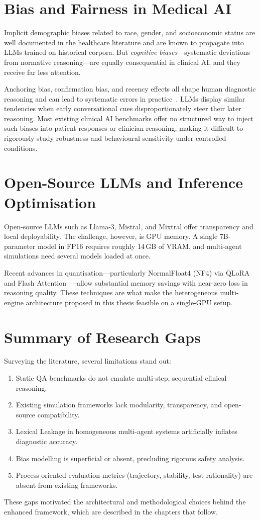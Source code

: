 \section{Bias and Fairness in Medical AI}

Implicit demographic biases related to race, gender, and socioeconomic status are well documented in the healthcare literature and are known to propagate into LLMs trained on historical corpora. But \textit{cognitive biases}---systematic deviations from normative reasoning---are equally consequential in clinical AI, and they receive far less attention.

Anchoring bias, confirmation bias, and recency effects all shape human diagnostic reasoning and can lead to systematic errors in practice~\cite{johri2023guidelines}. LLMs display similar tendencies when early conversational cues disproportionately steer their later reasoning. Most existing clinical AI benchmarks offer no structured way to inject such biases into patient responses or clinician reasoning, making it difficult to rigorously study robustness and behavioural sensitivity under controlled conditions.

\section{Open-Source LLMs and Inference Optimisation}

Open-source LLMs such as Llama-3, Mistral, and Mixtral offer transparency and local deployability. The challenge, however, is GPU memory. A single 7B-parameter model in FP16 requires roughly 14\,GB of VRAM, and multi-agent simulations need several models loaded at once.

Recent advances in quantisation---particularly NormalFloat4 (NF4) via QLoRA and Flash Attention~\cite{du2023improving}---allow substantial memory savings with near-zero loss in reasoning quality. These techniques are what make the heterogeneous multi-engine architecture proposed in this thesis feasible on a single-GPU setup.

\section{Summary of Research Gaps}

Surveying the literature, several limitations stand out:
\begin{enumerate}
    \item Static QA benchmarks do not emulate multi-step, sequential clinical reasoning.
    \item Existing simulation frameworks lack modularity, transparency, and open-source compatibility.
    \item Lexical Leakage in homogeneous multi-agent systems artificially inflates diagnostic accuracy.
    \item Bias modelling is superficial or absent, precluding rigorous safety analysis.
    \item Process-oriented evaluation metrics (trajectory, stability, test rationality) are absent from existing frameworks.
\end{enumerate}

These gaps motivated the architectural and methodological choices behind the enhanced framework, which are described in the chapters that follow.
